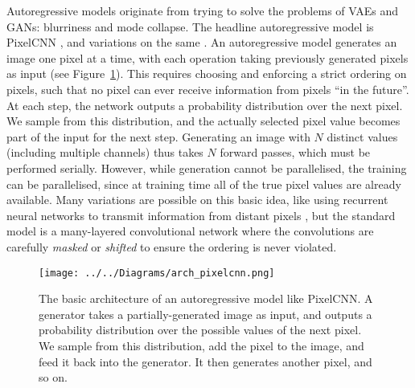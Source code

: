 \documentclass[11pt, a4paper, openany]{book}
\newcommand{\nquote}[1]{``{#1}''}
\begin{document}
Autoregressive models originate from trying to solve the problems of VAEs and GANs: blurriness and mode collapse. The headline autoregressive model is PixelCNN \citep{pixelcnn2}, and variations on the same \citep{pixelcnn3,pixelcnn++,superres,wavenet,bytenet,videopixel}. An autoregressive model generates an image one pixel at a time, with each operation taking previously generated pixels as input (see Figure~\ref{archpixelcnn}). This requires choosing and enforcing a strict ordering on pixels, such that no pixel can ever receive information from pixels \nquote{in the future}. At each step, the network outputs a probability distribution over the next pixel. We sample from this distribution, and the actually selected pixel value becomes part of the input for the next step. Generating an image with $N$ distinct values (including multiple channels) thus takes $N$ forward passes, which must be performed serially. However, while generation cannot be parallelised, the training can be parallelised, since at training time all of the true pixel values are already available. Many variations are possible on this basic idea, like using recurrent neural networks to transmit information from distant pixels \citep{pixelcnn1}, but the standard model is a many-layered convolutional network where the convolutions are carefully \emph{masked} \citep{pixelcnn2} or \emph{shifted} \citep{pixelcnn++} to ensure the ordering is never violated.

\begin{figure}
  \centering
  \texttt{[image: ../../Diagrams/arch\_pixelcnn.png]}
  \caption[Architecture of an autoregressive model]{The basic architecture of an autoregressive model like PixelCNN. A generator takes a partially-generated image as input, and outputs a probability distribution over the possible values of the next pixel. We sample from this distribution, add the pixel to the image, and feed it back into the generator. It then generates another pixel, and so on.}
  \label{archpixelcnn}
\end{figure}
\end{document}
